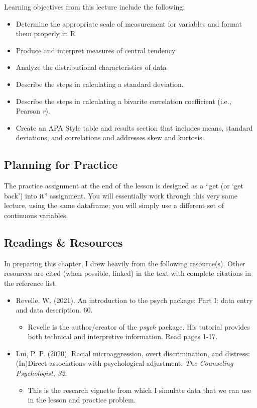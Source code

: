 \documentclass[
  11pt,
]{book}
\providecommand{\tightlist}{%
  \setlength{\itemsep}{0pt}\setlength{\parskip}{0pt}}
\begin{document}
Learning objectives from this lecture include the following:

\begin{itemize}
\tightlist
\item
  Determine the appropriate scale of measurement for variables and format them properly in R
\item
  Produce and interpret measures of central tendency
\item
  Analyze the distributional characteristics of data
\item
  Describe the steps in calculating a standard deviation.
\item
  Describe the steps in calculating a bivarite correlation coefficient (i.e., Pearson \emph{r}).
\item
  Create an APA Style table and results section that includes means, standard deviations, and correlations and addresses skew and kurtosis.
\end{itemize}

\hypertarget{planning-for-practice}{%
\subsection{Planning for Practice}\label{planning-for-practice}}

The practice assignment at the end of the lesson is designed as a ``get (or `get back') into it'' assignment. You will essentially work through this very same lecture, using the same dataframe; you will simply use a different set of continuous variables.

\hypertarget{readings-resources}{%
\subsection{Readings \& Resources}\label{readings-resources}}

In preparing this chapter, I drew heavily from the following resource(s). Other resources are cited (when possible, linked) in the text with complete citations in the reference list.

\begin{itemize}
\tightlist
\item
  Revelle, W. (2021). An introduction to the psych package: Part I: data entry and data description. 60.

  \begin{itemize}
  \tightlist
  \item
    Revelle is the author/creator of the \emph{psych} package. His tutorial provides both technical and interpretive information. Read pages 1-17.
  \end{itemize}
\item
  Lui, P. P. (2020). Racial microaggression, overt discrimination, and distress: (In)Direct associations with psychological adjustment. \emph{The Counseling Psychologist, 32}.

  \begin{itemize}
  \tightlist
  \item
    This is the research vignette from which I simulate data that we can use in the lesson and practice problem.
  \end{itemize}
\end{itemize}
\end{document}
